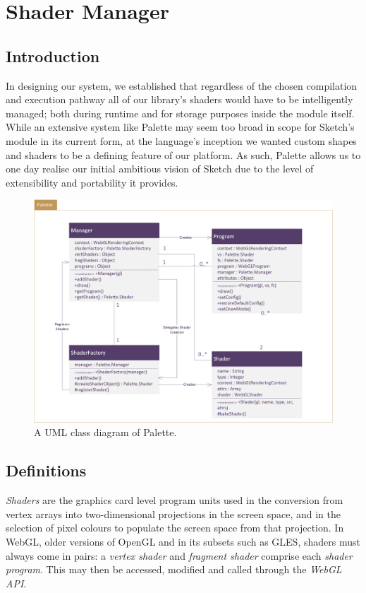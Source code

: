 \documentclass{l3proj}
\begin{document}
\section{Shader Manager}
\label{arch-shad}

\subsection{Introduction}
\label{arch-shad-intro}
In designing our system, we established that regardless of the chosen compilation and execution pathway all of our library's shaders would have to be intelligently managed; both during runtime and for storage purposes inside the module itself. While an extensive system like Palette may seem too broad in scope for Sketch's module in its current form, at the language's inception we wanted custom shapes and shaders to be a defining feature of our platform. As such, Palette allows us to one day realise our initial ambitious vision of Sketch due to the level of extensibility and portability it provides.

\begin{figure}[!h]
\centering
\includegraphics[width=\textwidth]{images/Palette-UML}
\caption{A UML class diagram of Palette.}
\label{fig:palette-uml}
\end{figure}

\subsection{Definitions}
\label{arch-shad-def}
\textit{Shaders} are the graphics card level program units used in the conversion from vertex arrays into two-dimensional projections in the screen space, and in the selection of pixel colours to populate the screen space from that projection. In WebGL, older versions of OpenGL and in its subsets such as GLES, shaders must always come in pairs: a \textit{vertex shader} and \textit{fragment shader} comprise each \textit{shader program}. This may then be accessed, modified and called through the \textit{WebGL API}.
\end{document}
